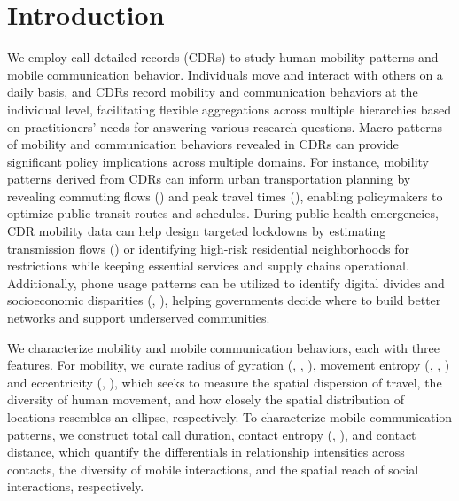 \chapter{Introduction}
We employ call detailed records (CDRs) to study human mobility patterns and mobile communication behavior.
Individuals move and interact with others on a daily basis, and CDRs record mobility and communication behaviors at the individual level, facilitating flexible aggregations across multiple hierarchies based on practitioners' needs for answering various research questions.
Macro patterns of mobility and communication behaviors revealed in CDRs can provide significant policy implications across multiple domains.
For instance, mobility patterns derived from CDRs can inform urban transportation planning by revealing commuting flows (\cite{phithakkitnukoon2012socio}) and peak travel times (\cite{tongsinoot2017exploring}), enabling policymakers to optimize public transit routes and schedules.
During public health emergencies, CDR mobility data can help design targeted lockdowns by estimating transmission flows (\cite{wesolowski2016connecting}) or identifying high-risk  residential neighborhoods for restrictions while keeping essential services and supply chains operational.
Additionally, phone usage patterns can be utilized to identify digital divides and socioeconomic disparities (\cite{onnela2007structure}, \cite{blumenstock2015predicting}), helping governments decide where to build better networks and support underserved communities.

We characterize mobility and mobile communication behaviors, each with three features.
For mobility, we curate radius of gyration (\cite{gonzalez2008understanding}, \cite{ranjan2012call}, \cite{pappalardo2015returners}), movement entropy (\cite{eagle2010network}, \cite{song2010limits}, \cite{pappalardo2016analytical}) and eccentricity (\cite{yuan2012correlating}, \cite{zhao2019effect}), which seeks to measure the spatial dispersion of travel, the diversity of human movement, and how closely the spatial distribution of locations resembles an ellipse, respectively.
To characterize mobile communication patterns, we construct total call duration, contact entropy (\cite{eagle2010network}, \cite{pappalardo2016analytical}), and contact distance, which quantify the differentials in relationship intensities across contacts, the diversity of mobile interactions, and the spatial reach of social interactions, respectively.

